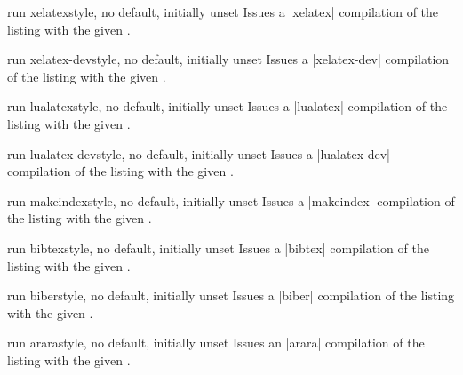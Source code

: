\begin{docTcbKey}[][doc new=2014-11-14]{run xelatex}{}{style, no default, initially unset}
Issues a |xelatex| compilation of the listing with the given .
\end{docTcbKey}

\begin{docTcbKey}[][doc new=2025-05-20]{run xelatex-dev}{}{style, no default, initially unset}
Issues a |xelatex-dev| compilation of the listing with the given .
\end{docTcbKey}

\begin{docTcbKey}[][doc new=2014-11-14]{run lualatex}{}{style, no default, initially unset}
Issues a |lualatex| compilation of the listing with the given .
\end{docTcbKey}

\begin{docTcbKey}[][doc new=2025-05-20]{run lualatex-dev}{}{style, no default, initially unset}
Issues a |lualatex-dev| compilation of the listing with the given .
\end{docTcbKey}

\begin{docTcbKey}[][doc new=2014-11-14]{run makeindex}{}{style, no default, initially unset}
Issues a |makeindex| compilation of the listing with the given .
\end{docTcbKey}

\begin{docTcbKey}[][doc new=2014-11-14]{run bibtex}{}{style, no default, initially unset}
Issues a |bibtex| compilation of the listing with the given .
\end{docTcbKey}

\begin{docTcbKey}[][doc new=2014-11-14]{run biber}{}{style, no default, initially unset}
Issues a |biber| compilation of the listing with the given .
\end{docTcbKey}

\begin{docTcbKey}[][doc new=2014-11-14]{run arara}{}{style, no default, initially unset}
Issues an |arara| compilation of the listing with the given .
\end{docTcbKey}

